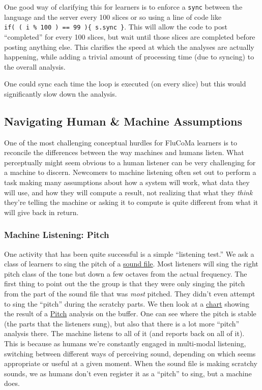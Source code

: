 \documentclass{article}
\begin{document}
One good way of clarifying this for learners is to enforce a
\texttt{sync} between the language and the server every 100 slices or so
using a line of code like
\texttt{if(\ (\ i\ \%\ 100\ )\ ==\ 99\ )\{\ s.sync\ \}}. This will allow
the code to post ``completed'' for every 100 slices, but wait until
those slices are completed before posting anything else. This clarifies
the speed at which the analyses are actually happening, while adding a
trivial amount of processing time (due to syncing) to the overall
analysis.

One could sync each time the loop is executed (on every slice) but this
would significantly slow down the analysis.

\subsection{Navigating Human \& Machine Assumptions}\label{navigating-human-machine-assumptions}

One of the most challenging conceptual hurdles for FluCoMa learners is
to reconcile the differences between the way machines and humans listen.
What perceptually might seem obvious to a human listener can be very
challenging for a machine to discern. Newcomers to machine listening
often set out to perform a task making many assumptions about how a
system will work, what data they will use, and how they will compute a
result, not realizing that what they \emph{think} they're telling the
machine or asking it to compute is quite different from what it will
give back in return.

\subsubsection{Machine Listening: Pitch}

One activity that has been quite successful is a simple ``listening
test.'' We ask a class of learners to sing the pitch of a
\href{https://learn.flucoma.org/learn/weighting-stats/01_src.mp3}{sound file}. Most listeners will sing the right pitch class of the tone
but down a few octaves from the actual frequency. The first thing to
point out the the group is that they were only singing the pitch from the part of the
sound file that was \emph{most} pitched. They didn't even attempt to
sing the ``pitch'' during the scratchy parts. We then look at a 
\href{https://learn.flucoma.org/learn/weighting-stats/03_src_with_pitch.jpg}{chart}
showing the result of a
\href{https://learn.flucoma.org/reference/pitch/}{Pitch} analysis on the
buffer. One can see where the pitch is stable (the parts that the
listeners sung), but also that there is a lot more ``pitch'' analysis
there. The machine listens to all of it (and reports back on all of it).
This is because as humans we're constantly engaged in multi-modal
listening, switching between different ways of perceiving sound,
depending on which seems appropriate or useful at a given moment. When
the sound file is making scratchy sounds, we as humans don't even
register it as a ``pitch'' to sing, but a machine does.
\end{document}
